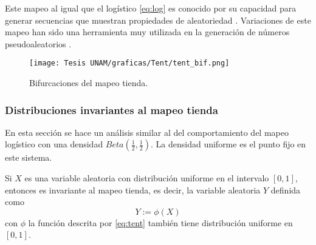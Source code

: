 \documentclass[../Main.tex]{subfiles}
\begin{document}
Este mapeo al igual que el logístico \ref{eq:log} es conocido por su capacidad para generar secuencias que muestran propiedades de aleatoriedad \cite{Schuster2005}. Variaciones de este mapeo han sido una herramienta muy utilizada en la generación de números pseudoaleatorios \cite{Callegari1997}.



\begin{figure}[h!]
    \centering
    \texttt{[image: Tesis UNAM/graficas/Tent/tent\_bif.png]}
    \caption{Bifurcaciones del mapeo tienda.}
    \label{fig:bif-log}
\end{figure} 



\subsubsection{Distribuciones invariantes al mapeo tienda}
En esta sección se hace un análisis similar al del comportamiento del mapeo logístico con una densidad $Beta(\frac{1}{2},\frac{1}{2})$. La densidad uniforme es el punto fijo en este sistema.
\begin{proposition}
\label{prop:tent_unif}
Si $X$ es una variable aleatoria con distribución uniforme en el intervalo $[0,1]$, entonces es invariante al mapeo tienda, es decir, la variable aleatoria $Y$ definida como  $$Y:=\phi(X)$$ con $\phi$ la función descrita por \ref{eq:tent} también tiene distribución uniforme en $[0,1]$.
\end{proposition}
\end{document}
